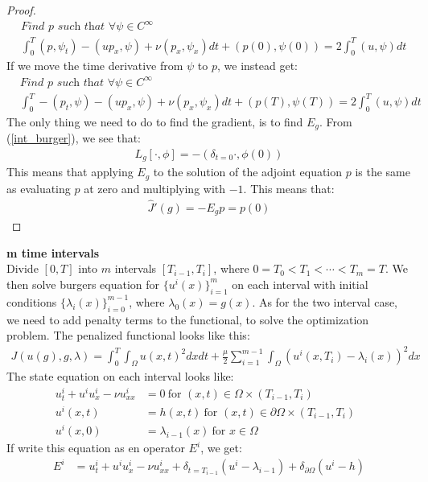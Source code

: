 \documentclass[11pt,a4paper]{article}
\begin{document}
\begin{proof}
\begin{align*}
&\textit{Find $p$ such that } \forall \psi \in C^{\infty} \\
&\int_0^T(p,\psi_t) -(up_x,\psi) +\nu(p_x,\psi_x)dt +(p(0),\psi(0)) = 2\int_0^T(u,\psi)dt
\end{align*}
If we move the time derivative from $\psi$ to $p$, we instead get:
\begin{align*}
&\textit{Find $p$ such that } \forall \psi \in C^{\infty} \\
&\int_0^T-(p_t,\psi) -(up_x,\psi) +\nu(p_x,\psi_x)dt +(p(T),\psi(T)) = 2\int_0^T(u,\psi)dt
\end{align*}
The only thing we need to do to find the gradient, is to find $E_g$. From (\ref{int_burger}), we see that:
\begin{align*}
L_g[\cdot,\phi] = -(\delta_{t=0}\cdot,\phi(0))
\end{align*} 
This means that applying $E_g$ to the solution of the adjoint equation $p$ is the same as evaluating $p$ at zero and multiplying with $-1$. This means that:
\begin{align*}
\hat{J}'(g) = -E_gp= p(0)
\end{align*}
\end{proof}
\textbf{m time intervals}
\\
Divide $[0,T]$ into $m$ intervals $[T_{i-1},T_i]$, where $0=T_0<T_1<\cdots<T_m=T$. We then solve burgers equation for $\{u^i(x)\}_{i=1}^m$ on each interval with initial conditions $\{\lambda_i(x)\}_{i=0}^{m-1}$, where $\lambda_0(x)=g(x)$. As for the two interval case, we need to add penalty terms to the functional, to solve the optimization problem. The penalized functional looks like this:
\begin{align*}
J(u(g),g,\lambda) = \int_0^T\int_{\Omega} u(x,t)^2 dxdt + \frac{\mu}{2}\sum_{i=1}^{m-1}\int_{\Omega} (u^i(x,T_i)-\lambda_i(x))^2dx
\end{align*}
The state equation on each interval looks like:
\begin{align*}
u_t^i + u^iu_x^i - \nu u_{xx}^i &= 0 \ \text{for $(x,t)\in \Omega\times(T_{i-1},T_i)$}\\
u^i(x,t) &= h(x,t) \ \text{for $(x,t) \in\partial\Omega\times(T_{i-1},T_i)$ } \\
u^i(x,0) &= \lambda_{i-1}(x) \ \text{for $x \in\Omega$ }
\end{align*} 
If write this equation as en operator $E^i$, we get:
\begin{align*}
E^i &= u_t^i + u^iu_x^i - \nu u_{xx}^i +\delta_{t=T_{i-1}}(u^i-\lambda_{i-1}) + \delta_{\partial \Omega}(u^i-h)
\end{align*}
\end{document}
